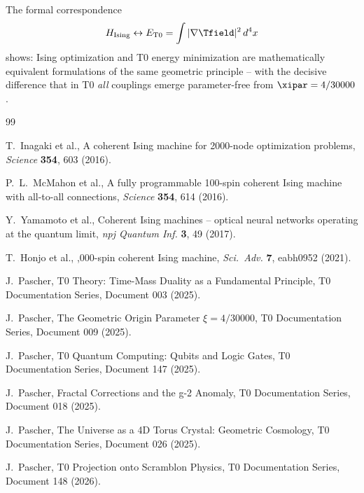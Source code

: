 \begin{keyresult}
    The formal correspondence
    \begin{equation}
        H_{\text{Ising}} \leftrightarrow E_{\text{T0}} = \int |\nabla \Tfield|^2 \, d^4x
    \end{equation}
    shows: Ising optimization and T0 energy minimization are mathematically equivalent
    formulations of the same geometric principle -- with the decisive difference that
    in T0 \emph{all} couplings emerge parameter-free from $\xipar = 4/30000$.
\end{keyresult}

\begin{thebibliography}{99}

T.~Inagaki et al.,
\newblock A coherent Ising machine for 2000-node optimization problems,
\newblock \emph{Science} \textbf{354}, 603 (2016).

P.~L.~McMahon et al.,
\newblock A fully programmable 100-spin coherent Ising machine with all-to-all connections,
\newblock \emph{Science} \textbf{354}, 614 (2016).

Y.~Yamamoto et al.,
\newblock Coherent Ising machines -- optical neural networks operating at the quantum limit,
\newblock \emph{npj Quantum Inf.} \textbf{3}, 49 (2017).

T.~Honjo et al.,
,000-spin coherent Ising machine,
\newblock \emph{Sci.\ Adv.} \textbf{7}, eabh0952 (2021).

J.~Pascher,
\newblock T0 Theory: Time-Mass Duality as a Fundamental Principle,
\newblock T0 Documentation Series, Document 003 (2025).

J.~Pascher,
\newblock The Geometric Origin Parameter $\xi = 4/30000$,
\newblock T0 Documentation Series, Document 009 (2025).

J.~Pascher,
\newblock T0 Quantum Computing: Qubits and Logic Gates,
\newblock T0 Documentation Series, Document 147 (2025).

J.~Pascher,
\newblock Fractal Corrections and the g-2 Anomaly,
\newblock T0 Documentation Series, Document 018 (2025).

J.~Pascher,
\newblock The Universe as a 4D Torus Crystal: Geometric Cosmology,
\newblock T0 Documentation Series, Document 026 (2025).

J.~Pascher,
\newblock T0 Projection onto Scramblon Physics,
\newblock T0 Documentation Series, Document 148 (2026).

\end{thebibliography}
